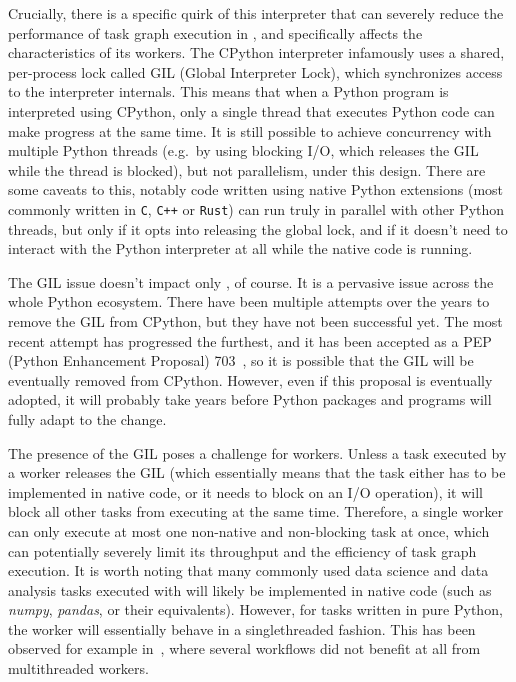 Crucially, there is a specific quirk of this interpreter that can severely reduce the performance
of task graph execution in \dask{}, and specifically affects the
characteristics of its workers. The CPython interpreter infamously uses a shared, per-process lock
called GIL (Global Interpreter Lock), which synchronizes access to the interpreter internals. This
means that when a Python program is interpreted using CPython, only a single thread that executes
Python code can make progress at the same time. It is still possible to achieve concurrency with
multiple Python threads (e.g.\ by using blocking I/O, which releases the GIL while the thread is
blocked), but not parallelism, under this design. There are some caveats to this, notably code
written using native Python extensions (most commonly written in \texttt{C},
\texttt{C++} or \texttt{Rust}) can run truly in parallel with other
Python threads, but only if it opts into releasing the global lock, and if it doesn't need to
interact with the Python interpreter at all while the native code is running.

The GIL issue doesn't impact only \dask{}, of course. It is a pervasive issue
across the whole Python ecosystem. There have been multiple attempts over the years to remove the
GIL from CPython, but they have not been successful yet. The most recent attempt has progressed the
furthest, and it has been accepted as a PEP (Python Enhancement Proposal)
703~\cite{pep703}, so it is possible that the GIL will be eventually removed from
CPython. However, even if this proposal is eventually adopted, it will probably take years before
Python packages and programs will fully adapt to the change.

The presence of the GIL poses a challenge for \dask{} workers. Unless a task
executed by a worker releases the GIL (which essentially means that the task either has to be
implemented in native code, or it needs to block on an I/O operation), it will block all other
tasks from executing at the same time. Therefore, a single \dask{} worker can
only execute at most one non-native and non-blocking task at once, which can potentially severely
limit its throughput and the efficiency of task graph execution. It is worth noting that many
commonly used data science and data analysis tasks executed with \dask{} will
likely be implemented in native code (such as \emph{numpy},
\emph{pandas}, or their \dask{} equivalents). However, for tasks
written in pure Python, the worker will essentially behave in a singlethreaded fashion. This has
been observed for example in~\cite{dasksparkcomparison}, where several workflows did not benefit
at all from multithreaded \dask{} workers.

